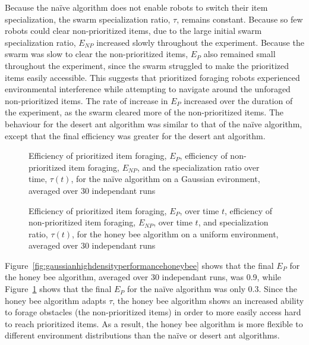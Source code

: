 Because the na\"ive algorithm does not enable robots to switch their item specialization, the swarm specialization ratio, $\tau$, remains constant. Because so few robots could clear non-prioritized items, due to the large initial swarm specialization ratio, $E_{NP}$ increased slowly throughout the experiment. Because the swarm was slow to clear the non-prioritized items, $E_P$ also remained small throughout the experiment, since the swarm struggled to make the prioritized items easily accessible. This suggests that prioritized foraging robots experienced environmental interference while attempting to navigate around the unforaged non-prioritized items. The rate of increase in $E_P$ increased over the duration of the experiment, as the swarm cleared more of the non-prioritized items. The behaviour for the desert ant algorithm was similar to that of the na\"ive algorithm, except that the final efficiency was greater for the desert ant algorithm.


\begin{figure}[!htbp]
\centering
\small
\resizebox{\textwidth}{!}{}
\caption{Efficiency of prioritized item foraging, $E_P$, efficiency of non-prioritized item foraging, $E_{NP}$, and the specialization ratio over time, $\tau(t)$, for the na\"ive algorithm on a Gaussian evironment, averaged over 30 independant runs}
\label{fig:gaussianhighdensityperformancenaive}
\end{figure}

\begin{figure}[!htb]
\centering
\small
\resizebox{\textwidth}{!}{}
\caption{Efficiency of prioritized item foraging, $E_P$, over time $t$, efficiency of non-prioritized item foraging, $E_{NP}$, over time $t$, and specialization ratio, $\tau(t)$, for the honey bee algorithm on a uniform environment, averaged over 30 independant runs}
\label{fig:uniformhighdensityperformancehoneybee}
\end{figure}


Figure~\ref{fig:gaussianhighdensityperformancehoneybee} shows that the final $E_P$ for the honey bee algorithm, averaged over 30 independant runs, was 0.9, while Figure~\ref{fig:gaussianhighdensityperformancenaive} shows that the final $E_P$ for the na\"ive algorithm was only 0.3. Since the honey bee algorithm adapts $\tau$, the honey bee algorithm shows an increased ability to forage obstacles (the non-prioritized items) in order to more easily access hard to reach prioritized items. As a result, the honey bee algorithm is more flexible to different environment distributions than the na\"ive or desert ant algorithms.


